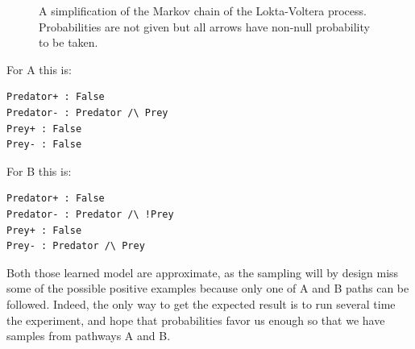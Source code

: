 \documentclass{llncs}
\begin{document}
\begin{figure}[htpb]
	\centering
	\caption{A simplification of the Markov chain of the Lokta-Voltera process. Probabilities are not given but all arrows have non-null probability to be taken.\label{fig:mc-lv}}
\end{figure}

\begin{minipage}{.45\textwidth}
For A this is:
\begin{verbatim}
Predator+ : False
Predator- : Predator /\ Prey
Prey+ : False
Prey- : False
\end{verbatim}
\end{minipage}
\begin{minipage}{.45\textwidth}
For B this is:
\begin{verbatim}
Predator+ : False
Predator- : Predator /\ !Prey
Prey+ : False
Prey- : Predator /\ Prey
\end{verbatim}
\end{minipage}

Both those learned model are approximate, as the sampling will by design miss some of the possible positive examples because only one of A and B paths can be followed.
Indeed, the only way to get the expected result is to run several time the experiment, and hope that probabilities favor us enough so that we have samples from pathways A and B.
\end{document}

